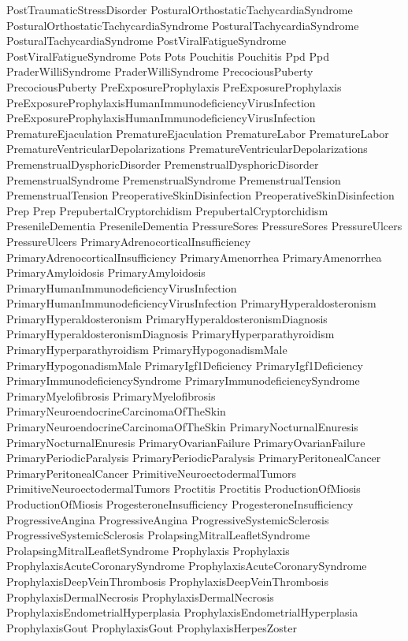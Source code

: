  PostTraumaticStressDisorder
 PosturalOrthostaticTachycardiaSyndrome
 PosturalOrthostaticTachycardiaSyndrome
 PosturalTachycardiaSyndrome
 PosturalTachycardiaSyndrome
 PostViralFatigueSyndrome
 PostViralFatigueSyndrome
 Pots
 Pots
 Pouchitis
 Pouchitis
 Ppd
 Ppd
 PraderWilliSyndrome
 PraderWilliSyndrome
 PrecociousPuberty
 PrecociousPuberty
 PreExposureProphylaxis
 PreExposureProphylaxis
 PreExposureProphylaxisHumanImmunodeficiencyVirusInfection
 PreExposureProphylaxisHumanImmunodeficiencyVirusInfection
 PrematureEjaculation
 PrematureEjaculation
 PrematureLabor
 PrematureLabor
 PrematureVentricularDepolarizations
 PrematureVentricularDepolarizations
 PremenstrualDysphoricDisorder
 PremenstrualDysphoricDisorder
 PremenstrualSyndrome
 PremenstrualSyndrome
 PremenstrualTension
 PremenstrualTension
 PreoperativeSkinDisinfection
 PreoperativeSkinDisinfection
 Prep
 Prep
 PrepubertalCryptorchidism
 PrepubertalCryptorchidism
 PresenileDementia
 PresenileDementia
 PressureSores
 PressureSores
 PressureUlcers
 PressureUlcers
 PrimaryAdrenocorticalInsufficiency
 PrimaryAdrenocorticalInsufficiency
 PrimaryAmenorrhea
 PrimaryAmenorrhea
 PrimaryAmyloidosis
 PrimaryAmyloidosis
 PrimaryHumanImmunodeficiencyVirusInfection
 PrimaryHumanImmunodeficiencyVirusInfection
 PrimaryHyperaldosteronism
 PrimaryHyperaldosteronism
 PrimaryHyperaldosteronismDiagnosis
 PrimaryHyperaldosteronismDiagnosis
 PrimaryHyperparathyroidism
 PrimaryHyperparathyroidism
 PrimaryHypogonadismMale
 PrimaryHypogonadismMale
 PrimaryIgf1Deficiency
 PrimaryIgf1Deficiency
 PrimaryImmunodeficiencySyndrome
 PrimaryImmunodeficiencySyndrome
 PrimaryMyelofibrosis
 PrimaryMyelofibrosis
 PrimaryNeuroendocrineCarcinomaOfTheSkin
 PrimaryNeuroendocrineCarcinomaOfTheSkin
 PrimaryNocturnalEnuresis
 PrimaryNocturnalEnuresis
 PrimaryOvarianFailure
 PrimaryOvarianFailure
 PrimaryPeriodicParalysis
 PrimaryPeriodicParalysis
 PrimaryPeritonealCancer
 PrimaryPeritonealCancer
 PrimitiveNeuroectodermalTumors
 PrimitiveNeuroectodermalTumors
 Proctitis
 Proctitis
 ProductionOfMiosis
 ProductionOfMiosis
 ProgesteroneInsufficiency
 ProgesteroneInsufficiency
 ProgressiveAngina
 ProgressiveAngina
 ProgressiveSystemicSclerosis
 ProgressiveSystemicSclerosis
 ProlapsingMitralLeafletSyndrome
 ProlapsingMitralLeafletSyndrome
 Prophylaxis
 Prophylaxis
 ProphylaxisAcuteCoronarySyndrome
 ProphylaxisAcuteCoronarySyndrome
 ProphylaxisDeepVeinThrombosis
 ProphylaxisDeepVeinThrombosis
 ProphylaxisDermalNecrosis
 ProphylaxisDermalNecrosis
 ProphylaxisEndometrialHyperplasia
 ProphylaxisEndometrialHyperplasia
 ProphylaxisGout
 ProphylaxisGout
 ProphylaxisHerpesZoster
